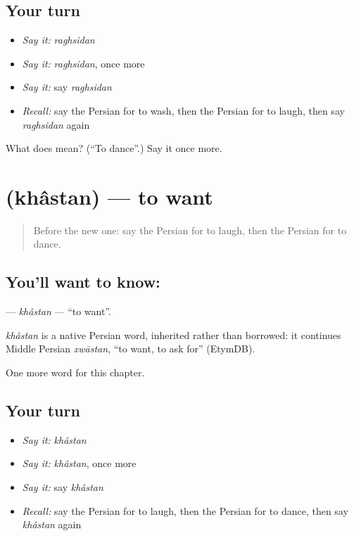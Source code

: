 \subsection*{Your turn}
\begin{itemize}
\raggedright
  \item \emph{Say it:} \emph{raghsidan}
  \item \emph{Say it:} \emph{raghsidan}, once more
  \item \emph{Say it:} say \emph{raghsidan}
  \item \emph{Recall:} say the Persian for to wash, then the Persian for to laugh, then say \emph{raghsidan} again
\end{itemize}

\begin{tcolorbox}[breakable,colback=teal!4,colframe=teal!35!black,title={Before you move on}]
What does  mean? (\textquotedblleft{}To dance\textquotedblright{}.) Say it once more.
\end{tcolorbox}
\section[\texorpdfstring{\fa{خواستن} (khâstan)}{خواستن (khâstan)}]{ (khâstan) — to want}

\label{lesson:FA-C38-khastan}



\begin{quote}
Before the new one: say the Persian for to laugh, then the Persian for to dance.
\end{quote}

\subsection*{You'll want to know: }
\textbf{} — \emph{khâstan} — \textquotedblleft{}to want\textquotedblright{}.

\begin{cousinweb}
\emph{khâstan} is a native Persian word, inherited rather than borrowed: it continues Middle Persian \emph{xwāstan}, \textquotedblleft{}to want, to ask for\textquotedblright{} (EtymDB).
\end{cousinweb}

\begin{grammarlens}[title={What you've built}]
One more word for this chapter.
\end{grammarlens}

\subsection*{Your turn}
\begin{itemize}
\raggedright
  \item \emph{Say it:} \emph{khâstan}
  \item \emph{Say it:} \emph{khâstan}, once more
  \item \emph{Say it:} say \emph{khâstan}
  \item \emph{Recall:} say the Persian for to laugh, then the Persian for to dance, then say \emph{khâstan} again
\end{itemize}

